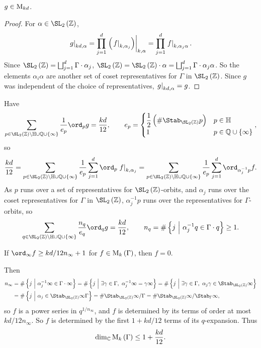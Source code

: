 \begin{proposition}
$ g \in \mathrm{M}_{kd} $.
\end{proposition}

\begin{proof}
For $ \alpha \in \SL_2\br{\ZZ} $,
$$ \eval{g}_{kd, \alpha} = \prod_{j = 1}^d \eval{\br{\eval{f}_{k, \alpha_j}}}_{k, \alpha} = \prod_{j = 1}^d \eval{f}_{k, \alpha_j\alpha}. $$
Since $ \SL_2\br{\ZZ} = \bigsqcup_{j = 1}^d \Gamma \cdot \alpha_j $, $ \SL_2\br{\ZZ} = \SL_2\br{\ZZ} \cdot \alpha = \bigsqcup_{j = 1}^d \Gamma \cdot \alpha_j\alpha $. So the elements $ \alpha_i\alpha $ are another set of coset representatives for $ \Gamma $ in $ \SL_2\br{\ZZ} $. Since $ g $ was independent of the choice of representatives, $ \left. g \right|_{kd, \alpha} = g $.
\end{proof}

Have
$$ \sum_{p \in \SL_2\br{\ZZ} \backslash \HH \cup \QQ \cup \cbr{\infty}} \dfrac{1}{e_p}\ord_p g = \dfrac{kd}{12}, \qquad e_p =
\begin{cases}
\dfrac{1}{2}\br{\#\Stab_{\SL_2\br{\ZZ}} p} & p \in \HH \\
1 & p \in \QQ \cup \cbr{\infty}
\end{cases},
$$
so
$$ \dfrac{kd}{12} = \sum_{p \in \SL_2\br{\ZZ} \backslash \HH \cup \QQ \cup \cbr{\infty}} \dfrac{1}{e_p}\sum_{j = 1}^d \ord_p \eval{f}_{k, \alpha_j} = \sum_{p \in \SL_2\br{\ZZ} \backslash \HH \cup \QQ \cup \cbr{\infty}} \dfrac{1}{e_p}\sum_{j = 1}^d \ord_{\alpha_j^{-1}p} f. $$
As $ p $ runs over a set of representatives for $ \SL_2\br{\ZZ} $-orbits, and $ \alpha_j $ runs over the coset representatives for $ \Gamma $ in $ \SL_2\br{\ZZ} $, $ \alpha_j^{-1}p $ runs over the representatives for $ \Gamma $-orbits, so
$$ \sum_{q \in \SL_2\br{\ZZ} \backslash \HH \cup \QQ \cup \cbr{\infty}} \dfrac{n_q}{e_q}\ord_q g = \dfrac{kd}{12}, \qquad n_q = \#\cbr{j \st \alpha_j^{-1}q \in \Gamma \cdot q} \ge 1. $$

\begin{corollary}
If $ \ord_\infty f \ge kd / 12n_\infty + 1 $ for $ f \in \M_k\br{\Gamma} $, then $ f = 0 $.
\end{corollary}

Then
\begin{align*}
n_\infty
& = \#\cbr{j \st \alpha_j^{-1}\infty \in \Gamma \cdot \infty}
= \#\cbr{j \st \exists \gamma \in \Gamma, \ \alpha_j^{-1}\infty
= \gamma\infty} = \#\cbr{j \st \exists \gamma \in \Gamma, \ \alpha_j\gamma \in \Stab_{\SL_2\br{\ZZ}} \infty} \\
& = \#\cbr{j \st \alpha_j \in \Stab_{\SL_2\br{\ZZ}} \infty\Gamma}
= \#\Stab_{\SL_2\br{\ZZ}} \infty / \Gamma
= \#\Stab_{\SL_2\br{\ZZ}} \infty / \Stab_\Gamma \infty,
\end{align*}
so $ f $ is a power series in $ q^{1 / n_\infty} $, and $ f $ is determined by its terms of order at most $ kd / 12n_\infty $. So $ f $ is determined by the first $ 1 + kd / 12 $ terms of its $ q $-expansion. Thus
$$ \dim_\CC \M_k\br{\Gamma} \le 1 + \dfrac{kd}{12}. $$

